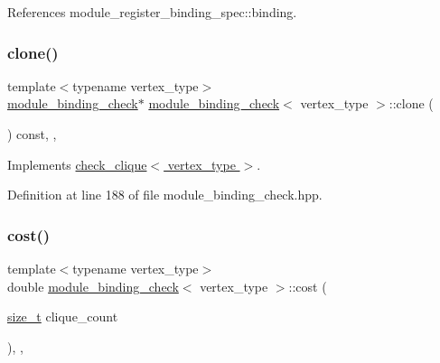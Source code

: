 References module\+\_\+register\+\_\+binding\+\_\+spec\+::binding.

\mbox{\label{structmodule__binding__check_a90b355e641f9f90ee4e1c2d1bf7d8929}} 
\subsubsection{\texorpdfstring{clone()}{clone()}}
{\footnotesize\ttfamily template$<$typename vertex\+\_\+type$>$ \\
\hyperlink{structmodule__binding__check}{module\+\_\+binding\+\_\+check}$\ast$ \hyperlink{structmodule__binding__check}{module\+\_\+binding\+\_\+check}$<$ vertex\+\_\+type $>$\+::clone (\begin{DoxyParamCaption}{ }\end{DoxyParamCaption}) const\hspace{0.3cm}{\ttfamily [inline]}, {\ttfamily [override]}, {\ttfamily [virtual]}}



Implements \hyperlink{structcheck__clique_a2a91d2e947216240ac91ea541fd63182}{check\+\_\+clique$<$ vertex\+\_\+type $>$}.



Definition at line 188 of file module\+\_\+binding\+\_\+check.\+hpp.

\mbox{\label{structmodule__binding__check_a7ab5b520f8ab3065e15a4726a61995b7}} 
\subsubsection{\texorpdfstring{cost()}{cost()}}
{\footnotesize\ttfamily template$<$typename vertex\+\_\+type$>$ \\
double \hyperlink{structmodule__binding__check}{module\+\_\+binding\+\_\+check}$<$ vertex\+\_\+type $>$\+::cost (\begin{DoxyParamCaption}\item[{\hyperlink{tutorial__fpt__2017_2intro_2sixth_2test_8c_a7c94ea6f8948649f8d181ae55911eeaf}{size\+\_\+t}}]{clique\+\_\+count }\end{DoxyParamCaption})\hspace{0.3cm}{\ttfamily [inline]}, {\ttfamily [override]}, {\ttfamily [virtual]}}



